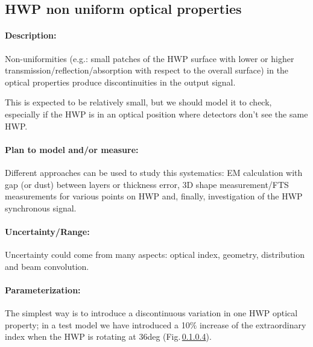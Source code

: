 \subsection{HWP non uniform optical properties}

\paragraph{Description:}
Non-uniformities (e.g.: small patches of the HWP surface with lower or higher transmission/reflection/absorption with respect to the overall surface) in the optical properties produce discontinuities in the output signal.

This is expected to be relatively small, but we should model it to check, especially if the
HWP is in an optical position where detectors don’t see the same HWP.

\paragraph{Plan to model and/or measure:}
Different approaches can be used to study this systematics:
EM calculation with gap (or dust) between layers or thickness error,
3D shape measurement/FTS measurements for various points on HWP and, finally, investigation of the
HWP synchronous signal.

\paragraph{Uncertainty/Range:}
Uncertainty could come from many aspects:
optical index, geometry, distribution and beam convolution.

\paragraph{Parameterization:}
The simplest way is to introduce a discontinuous variation in one HWP optical property;
in a test model we have introduced a 10$\%$ increase of the extraordinary index when the HWP
is rotating at 36deg (Fig.\,\ref{}).



